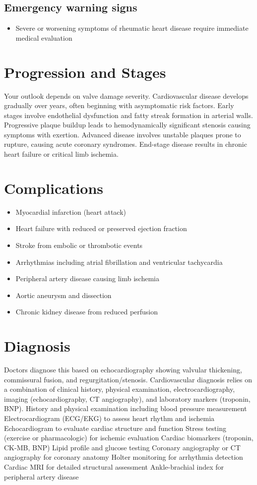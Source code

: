 \subsection{Emergency warning signs}
\begin{itemize}[noitemsep]
  \item Severe or worsening symptoms of rheumatic heart disease require immediate medical evaluation
\end{itemize}
\section{Progression and Stages}
Your outlook depends on valve damage severity. Cardiovascular disease develops gradually over years, often beginning with asymptomatic risk factors. Early stages involve endothelial dysfunction and fatty streak formation in arterial walls. Progressive plaque buildup leads to hemodynamically significant stenosis causing symptoms with exertion. Advanced disease involves unstable plaques prone to rupture, causing acute coronary syndromes. End-stage disease results in chronic heart failure or critical limb ischemia.
\section{Complications}
\begin{itemize}[noitemsep]
  \item Myocardial infarction (heart attack)
  \item Heart failure with reduced or preserved ejection fraction
  \item Stroke from embolic or thrombotic events
  \item Arrhythmias including atrial fibrillation and ventricular tachycardia
  \item Peripheral artery disease causing limb ischemia
  \item Aortic aneurysm and dissection
  \item Chronic kidney disease from reduced perfusion
\end{itemize}
\section{Diagnosis}
Doctors diagnose this based on echocardiography showing valvular thickening, commissural fusion, and regurgitation/stenosis. Cardiovascular diagnosis relies on a combination of clinical history, physical examination, electrocardiography, imaging (echocardiography, CT angiography), and laboratory markers (troponin, BNP). History and physical examination including blood pressure measurement Electrocardiogram (ECG/EKG) to assess heart rhythm and ischemia Echocardiogram to evaluate cardiac structure and function Stress testing (exercise or pharmacologic) for ischemic evaluation Cardiac biomarkers (troponin, CK-MB, BNP) Lipid profile and glucose testing Coronary angiography or CT angiography for coronary anatomy Holter monitoring for arrhythmia detection Cardiac MRI for detailed structural assessment Ankle-brachial index for peripheral artery disease

